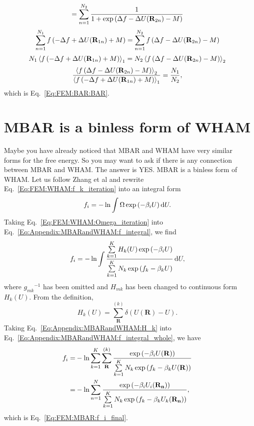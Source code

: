 \begin{appendices}
\begin{equation}
=\sum\limits_{n=1}^{N_2} \frac{1}{1+\exp{\left(\Delta f-\Delta U(\mathbf{R}_{2n})-M\right)}}\notag
\end{equation}
\begin{equation}
\sum\limits_{n=1}^{N_1}f\left(-\Delta f+\Delta U(\mathbf{R}_{1n})+M\right)=\sum\limits_{n=1}^{N_2} f\left(\Delta f-\Delta U(\mathbf{R}_{2n})-M\right)\notag
\end{equation}
\begin{equation}
N_1\left<f\left(-\Delta f+\Delta U(\mathbf{R}_{1n})+M\right)\right>_1=N_2\left<f\left(\Delta f-\Delta U(\mathbf{R}_{2n})-M\right)\right>_2\notag
\end{equation}
\begin{equation}
\frac{\left<f\left(\Delta f-\Delta U(\mathbf{R}_{2n})-M\right)\right>_2}{\left<f\left(-\Delta f+\Delta U(\mathbf{R}_{1n})+M\right)\right>_1}=\frac{N_1}{N_2},\notag
\end{equation}
which is Eq.~\ref{Eq:FEM:BAR:BAR}.

\chapter{MBAR is a binless form of WHAM\label{chapter:Appendix:MBARandWHAM}}
Maybe you have already noticed that MBAR and WHAM have very similar forms for the free energy. 
So you may want to ask if there is any connection between MBAR and WHAM. The answer is YES. 
MBAR is a binless form of WHAM.\cite{TanJCP2012} Let us follow Zhang et al\cite{ZhangMS2016} 
and rewrite Eq.~\ref{Eq:FEM:WHAM:f_k_iteration} into an integral form
\begin{equation}
f_i=-\ln\int\Omega\exp{(-\beta_iU)}\mathop{}\!\mathrm{d} U.
\label{Eq:Appendix:MBARandWHAM:f_integral}
\end{equation}
Taking Eq.~\ref{Eq:FEM:WHAM:Omega_iteration} into Eq.~\ref{Eq:Appendix:MBARandWHAM:f_integral}, we find
\begin{equation}
f_i=-\ln\int\frac{\sum\limits_{k=1}^{K}H_k(U)\exp{(-\beta_iU)}}{\sum\limits_{k=1}^{K}N_k\exp{(f_k-\beta_kU)}}\mathop{}\!\mathrm{d} U,
\label{Eq:Appendix:MBARandWHAM:f_integral_whole}
\end{equation}
where ${g_{mk}}^{-1}$ has been omitted and $H_{mk}$ has been changed to continuous form $H_k(U)$. From the definition,
\begin{equation}
H_k(U)=\sum\limits_{\mathbf{R}}^{(k)}\delta (U(\mathbf{R})-U).
\label{Eq:Appendix:MBARandWHAM:H_k}
\end{equation}
Taking Eq.~\ref{Eq:Appendix:MBARandWHAM:H_k} into Eq.~\ref{Eq:Appendix:MBARandWHAM:f_integral_whole}, we have
\begin{align}
f_i=&-\ln\sum\limits_{k=1}^{K}\sum\limits_{\mathbf{R}}^{(k)}\frac{\exp{(-\beta_iU(\mathbf{R}))}}{\sum\limits_{k=1}^{K}N_k\exp{(f_k-\beta_kU(\mathbf{R}))}}\notag\\
   =&-\ln\sum\limits_{n=1}^{N}\frac{\exp{(-\beta_iU_i(\mathbf{R_n}))}}{\sum\limits_{k=1}^{K}N_k\exp{(f_k-\beta_kU_k(\mathbf{R_n}))}},
\end{align}
which is Eq.~\ref{Eq:FEM:MBAR:f_i_final}.

\end{appendices}
